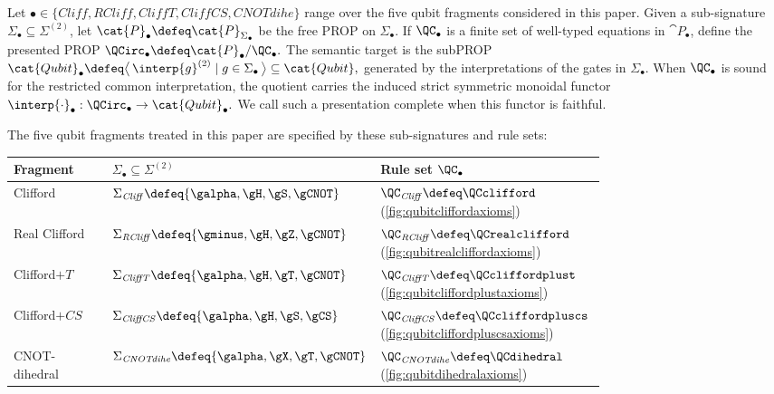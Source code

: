 \begin{definition}\label{def:qubit-fragment-scheme}
Let
\(
  \bullet \in \{\mathit{Cliff}, \mathit{RCliff}, \mathit{CliffT}, \mathit{CliffCS}, \mathit{CNOTdihe}\}
\)
range over the five qubit fragments considered in this paper.  Given a sub-signature \(\Sigma_\bullet\subseteq\Sigma^{(2)}\), let
\(\cat{P}_\bullet\defeq\cat{P}_{\Sigma_\bullet}\) be the free PROP on \(\Sigma_\bullet\).  If
\(\QC_\bullet\) is a finite set of well-typed equations in \(\cat{P}_\bullet\), define the presented
PROP
\(
  \QCirc_\bullet\defeq\cat{P}_\bullet/\QC_\bullet.
\)
The semantic target is the subPROP
\(
  \cat{Qubit}_\bullet
  \defeq
  \big\langle\,\interp{g}^{(2)} \mid g\in\Sigma_\bullet\,\big\rangle
  \subseteq
  \cat{Qubit},
\)
generated by the interpretations of the gates in \(\Sigma_\bullet\).  When \(\QC_\bullet\) is sound
for the restricted common interpretation, the quotient carries the induced strict symmetric
monoidal functor
\(
  \interp{\cdot}_\bullet:\QCirc_\bullet\to\cat{Qubit}_\bullet.
\)
We call such a presentation complete when this functor is faithful.
\end{definition}

\begin{definition}\label{def:qubit-fragments}
The five qubit fragments treated in this paper are specified by these sub-signatures and rule sets:
\begin{center}
\begin{tabular}{@{}l p{0.38\linewidth} p{0.38\linewidth}@{}}
\textbf{Fragment} & \(\Sigma_\bullet\subseteq\Sigma^{(2)}\) & \textbf{Rule set \(\QC_\bullet\)} \\
\hline
Clifford
& \(\Sigma_{\mathit{Cliff}}\defeq\{\galpha,\gH,\gS,\gCNOT\}\)
& \(\QC_{\mathit{Cliff}}\defeq\QCclifford\) (\cref{fig:qubitcliffordaxioms})
\\
Real Clifford
& \(\Sigma_{\mathit{RCliff}}\defeq\{\gminus,\gH,\gZ,\gCNOT\}\)
& \(\QC_{\mathit{RCliff}}\defeq\QCrealclifford\) (\cref{fig:qubitrealcliffordaxioms})
\\
Clifford\(+T\)
& \(\Sigma_{\mathit{CliffT}}\defeq\{\galpha,\gH,\gT,\gCNOT\}\)
& \(\QC_{\mathit{CliffT}}\defeq\QCcliffordplust\) (\cref{fig:qubitcliffordplustaxioms})
\\
Clifford\(+CS\)
& \(\Sigma_{\mathit{CliffCS}}\defeq\{\galpha,\gH,\gS,\gCS\}\)
& \(\QC_{\mathit{CliffCS}}\defeq\QCcliffordpluscs\) (\cref{fig:qubitcliffordpluscsaxioms})
\\
CNOT-dihedral
& \(\Sigma_{\mathit{CNOTdihe}}\defeq\{\galpha,\gX,\gT,\gCNOT\}\)
& \(\QC_{\mathit{CNOTdihe}}\defeq\QCdihedral\) (\cref{fig:qubitdihedralaxioms})
\end{tabular}
\end{center}
\end{definition}

